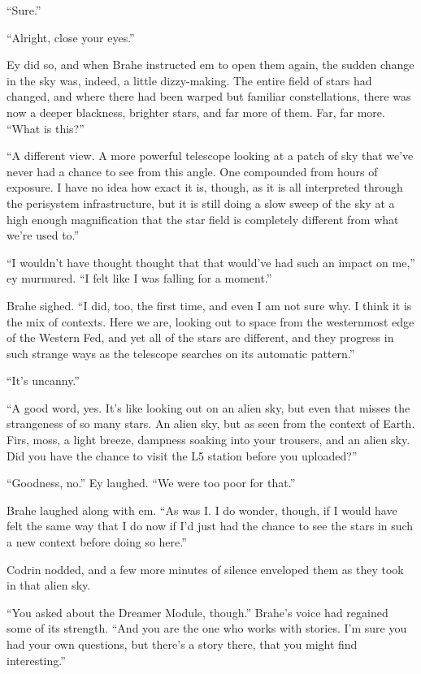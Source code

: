 ``Sure.''

``Alright, close your eyes.''

Ey did so, and when Brahe instructed em to open them again, the sudden change in the sky was, indeed, a little dizzy-making. The entire field of stars had changed, and where there had been warped but familiar constellations, there was now a deeper blackness, brighter stars, and far more of them. Far, far more. ``What is this?''

``A different view. A more powerful telescope looking at a patch of sky that we've never had a chance to see from this angle. One compounded from hours of exposure. I have no idea how exact it is, though, as it is all interpreted through the perisystem infrastructure, but it is still doing a slow sweep of the sky at a high enough magnification that the star field is completely different from what we're used to.''

``I wouldn't have thought thought that that would've had such an impact on me,'' ey murmured. ``I felt like I was falling for a moment.''

Brahe sighed. ``I did, too, the first time, and even I am not sure why. I think it is the mix of contexts. Here we are, looking out to space from the westernmost edge of the Western Fed, and yet all of the stars are different, and they progress in such strange ways as the telescope searches on its automatic pattern.''

``It's uncanny.''

``A good word, yes. It's like looking out on an alien sky, but even that misses the strangeness of so many stars. An alien sky, but as seen from the context of Earth. Firs, moss, a light breeze, dampness soaking into your trousers, and an alien sky. Did you have the chance to visit the L5 station before you uploaded?''

``Goodness, no.'' Ey laughed. ``We were too poor for that.''

Brahe laughed along with em. ``As was I. I do wonder, though, if I would have felt the same way that I do now if I'd just had the chance to see the stars in such a new context before doing so here.''

Codrin nodded, and a few more minutes of silence enveloped them as they took in that alien sky.

``You asked about the Dreamer Module, though.'' Brahe's voice had regained some of its strength. ``And you are the one who works with stories. I'm sure you had your own questions, but there's a story there, that you might find interesting.''

